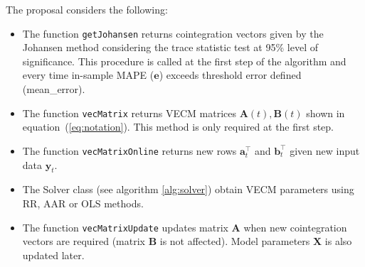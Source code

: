 The proposal considers the following:

\begin{itemize}
\item The function \texttt{getJohansen} returns cointegration vectors given by the
Johansen method considering the trace statistic test at 95\% level of
significance. This procedure is called at the first step of the algorithm and
every time in-sample MAPE ($\mathbf{e}$) exceeds threshold error defined (mean\_error).
\item The function \texttt{vecMatrix} returns VECM
matrices $\mathbf{A}(t),\mathbf{B}(t)$ shown in equation~(\ref{eq:notation}). This
method is only required at the first step.
\item The function \texttt{vecMatrixOnline} returns new rows $\mathbf{a}_t^\top$ and
$\mathbf{b}_t^\top$ given new input data $\mathbf{y}_t$.
\item The Solver class (see algorithm \ref{alg:solver}) obtain VECM parameters  
using RR, AAR or OLS methods.
\item The function \texttt{vecMatrixUpdate} updates matrix $\mathbf{A}$ when new
cointegration vectors are required (matrix $\mathbf{B}$ is not affected). Model
parameters $\mathbf{X}$ is also updated later.
\end{itemize}




